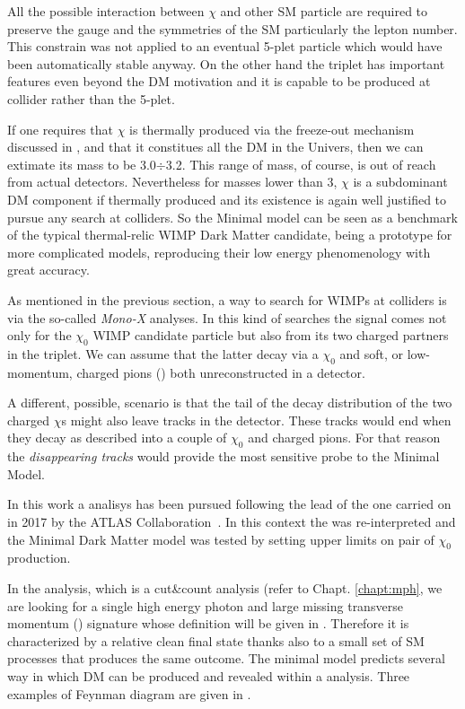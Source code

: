 All the possible interaction between $\chi$ and other SM particle are required to preserve the gauge and the symmetries of the SM particularly the lepton number. This constrain was not applied to an eventual 5-plet particle which would have been automatically stable anyway. On the other hand the triplet has important features even beyond the DM motivation and it is capable to be produced at collider rather than the 5-plet.

If one requires that $\chi$ is thermally produced via the freeze-out mechanism discussed in \Sect{\ref{sec:wimp}}, and that it constitues all the DM in the Univers, then we can extimate its mass to be \SI{3.0}{}$\div$\SI{3.2}{\tev}. This range of mass, of course, is out of reach from actual detectors. Nevertheless for masses lower than \SI{3}{\tev}, $\chi$ is a subdominant DM component if thermally produced and its existence is again well justified to pursue any search at colliders. So the Minimal model can be seen as a benchmark of the typical thermal-relic WIMP Dark Matter candidate, being a prototype for more complicated models, reproducing their low energy phenomenology with great accuracy.

As mentioned in the previous section, a way to search for WIMPs at colliders is via the so-called \emph{Mono-X} analyses. In this kind of searches the signal comes not only for the $\chi_0$ WIMP candidate particle but also from its two charged partners in the triplet. We can assume that the latter decay via a $\chi_0$ and soft, or low-momentum, charged pions (\pipm) both unreconstructed in a detector. 

A different, possible, scenario is that the tail of the decay distribution of the two charged $\chi$s might also leave tracks in the detector. These tracks would end when they decay as described into a couple of $\chi_0$ and charged pions. For that reason the \emph{disappearing tracks} would provide the most sensitive probe to the Minimal Model.

\smallskip
In this work a \mph analisys has been pursued following the lead of the one carried on in 2017 by the ATLAS Collaboration~\cite{paperMP}. In this context the \mph was re-interpreted and the Minimal Dark Matter model was tested by setting upper limits on pair of $\chi_0$ production.

In the \mph analysis, which is a cut\&count analysis (refer to Chapt. \ref{chapt:mph}, we are looking for a single high energy photon and large missing transverse momentum (\met) signature whose definition will be given in \Sect{\ref{sec:recoreal}}. Therefore it is characterized by a relative clean final state thanks also to a small set of SM processes that produces the same outcome. The minimal model predicts several way in which DM can be produced and revealed within a \mph analysis. Three examples of Feynman diagram are given in \Fig{\ref{fig:feynman}}.

